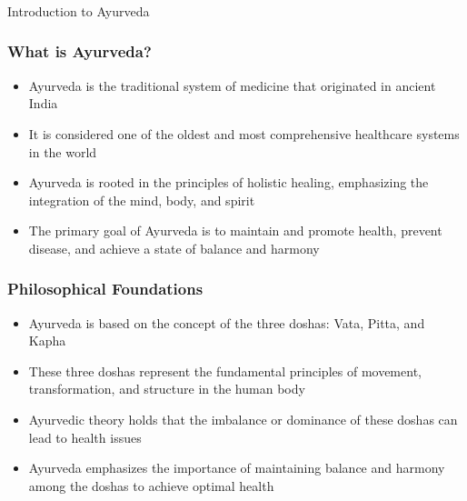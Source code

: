 \begin{frame}[fragile]\frametitle{}
\begin{center}
{\Large Introduction to Ayurveda}
\end{center}
\end{frame}

\begin{frame}[fragile]\frametitle{What is Ayurveda?}
    \begin{itemize}
        \item Ayurveda is the traditional system of medicine that originated in ancient India
        \item It is considered one of the oldest and most comprehensive healthcare systems in the world
        \item Ayurveda is rooted in the principles of holistic healing, emphasizing the integration of the mind, body, and spirit
        \item The primary goal of Ayurveda is to maintain and promote health, prevent disease, and achieve a state of balance and harmony
    \end{itemize}
\end{frame}

\begin{frame}[fragile]\frametitle{Philosophical Foundations}
    \begin{itemize}
        \item Ayurveda is based on the concept of the three doshas: Vata, Pitta, and Kapha
        \item These three doshas represent the fundamental principles of movement, transformation, and structure in the human body
        \item Ayurvedic theory holds that the imbalance or dominance of these doshas can lead to health issues
        \item Ayurveda emphasizes the importance of maintaining balance and harmony among the doshas to achieve optimal health
    \end{itemize}
\end{frame}

